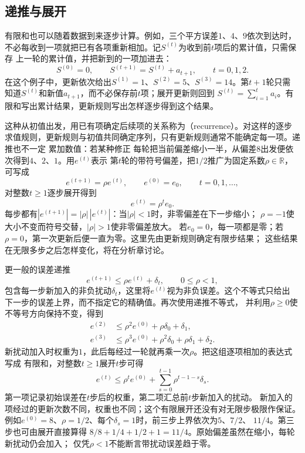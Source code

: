 \subsection{递推与展开}
\label{sec:prelim-recurrence-unrolling}

有限和也可以随着数据到来逐步计算。例如，三个平方误差$1$、$4$、$9$依次到达时，
不必每收到一项就把已有各项重新相加。记$S^{(t)}$为收到前$t$项后的累计值，只需保存
上一轮的累计值，并把新到的一项加进去：
\[
  S^{(0)}=0,\qquad S^{(t+1)}=S^{(t)}+a_{t+1},\qquad t=0,1,2.
\]
在这个例子中，更新依次给出$S^{(1)}=1$、$S^{(2)}=5$、$S^{(3)}=14$。第$t+1$轮只需
知道$S^{(t)}$和新值$a_{t+1}$，而不必保存前$t$项；展开更新则回到
$S^{(t)}=\sum_{i=1}^{t}a_i$。有限和写出累计结果，更新规则写出怎样逐步得到这个结果。

这种从初值出发，用已有项确定后续项的关系称为（recurrence）。对这样的逐步
求值规则，更新规则与初值共同确定序列，只有更新规则通常不能确定每一项。递推也不一定
累加数值：若某种修正
每轮把当前偏差缩小一半，从偏差$8$出发便依次得到$4$、$2$、$1$。用$e^{(t)}$表示
第$t$轮的带符号偏差，把$1/2$推广为固定系数$\rho\in\mathbb{R}$，可写成
\begin{equation}
  e^{(t+1)}=\rho e^{(t)},\qquad e^{(0)}=e_0,\qquad t=0,1,\ldots,
  \label{eq:prelim-geometric-recurrence}
\end{equation}
对整数$t\geq1$逐步展开得到
\[
  e^{(t)}=\rho^t e_0.
\]
每步都有$|e^{(t+1)}|=|\rho|\,|e^{(t)}|$：当$|\rho|<1$时，非零偏差在下一步缩小；
$\rho=-1$使大小不变而符号交替，$|\rho|>1$使非零偏差放大。
若$e_0=0$，每一项都是零；若$\rho=0$，第一次更新后便一直为零。这里先由更新规则确定有限步结果；
这些结果在无限多步之后怎样变化，将在分析章讨论。

更一般的误差递推
\begin{equation}
  e^{(t+1)}\leq \rho e^{(t)}+\delta_t,
  \qquad 0\leq\rho<1,
  \label{eq:prelim-perturbed-recurrence}
\end{equation}
包含每一步新加入的非负扰动$\delta_t$，这里将$e^{(t)}$视为非负误差。这个不等式只给出
下一步的误差上界，而不指定它的精确值。再次使用递推不等式，
并利用$\rho\geq0$使不等号方向保持不变，得到
\[
  \begin{aligned}
    e^{(2)}&\leq\rho^2e^{(0)}+\rho\delta_0+\delta_1,\\
    e^{(3)}&\leq\rho^3e^{(0)}+\rho^2\delta_0+\rho\delta_1+\delta_2.
  \end{aligned}
\]
新扰动加入时权重为$1$，此后每经过一轮就再乘一次$\rho$。把这组逐项相加的表达式写成
有限和，对整数$t\geq1$展开$t$步可得
\begin{equation}
  e^{(t)}
  \leq
  \rho^t e^{(0)}
  +
  \sum_{s=0}^{t-1}\rho^{t-1-s}\delta_s.
  \label{eq:prelim-unrolled-recurrence}
\end{equation}
第一项记录初始误差在$t$步后的权重，第二项汇总前$t$步新加入的扰动。
新加入的项经过的更新次数不同，权重也不同；这个有限展开还没有对无限步极限作保证。
例如$e^{(0)}=8$、$\rho=1/2$、每个$\delta_s=1$时，前三步上界依次为$5$、$7/2$、
$11/4$。第三步也可由展开直接算得
$8/8+1/4+1/2+1=11/4$。原始偏差虽然在缩小，每轮新扰动仍会加入；
仅凭$\rho<1$不能断言带扰动误差趋于零。

